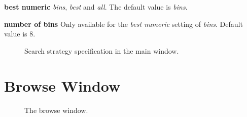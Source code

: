 \documentclass{article}
\begin{document}
\textbf{best numeric} \emph{bins}, \emph{best} and \emph{all}.
The default value is \emph{bins}.

\textbf{number of bins} Only available for the \emph{best numeric} setting of \emph{bins}.
Default value is \emph{$8$}.

\begin{figure}
\begin{center}
\centering
{}
\caption{Search strategy specification in the main window.}
\end{center}
\label{fig:searchstrategy}
\end{figure}






\section{Browse Window}
\label{section:browse-window}

\begin{figure}
\begin{center}
\centering
{}
\caption{The browse window.}
\end{center}
\label{fig:browsewindow}
\end{figure}
\end{document}
